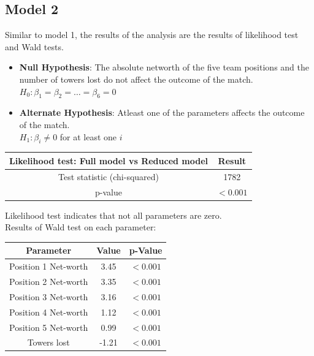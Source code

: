 \documentclass[11pt]{article}
\begin{document}
\subsection{Model 2}
Similar to model 1, the results of the analysis are the results of likelihood test
and Wald tests.
\begin{itemize}
    \item \textbf{Null Hypothesis}: The absolute networth of the five team positions
    and the number of towers lost do not affect the outcome of the match.
    \\ \(H_0: \beta_1 = \beta_2 = \dots = \beta_6 = 0\)
    \item \textbf{Alternate Hypothesis}: Atleast one of the parameters affects the
    outcome of the match.
    \\ \(H_1: \beta_i \neq 0\) for at least one \(i\)
\end{itemize}
\begin{table}[h]
    \centering
    \begin{tabular}{|c|c|}
        \hline
        \textbf{Likelihood test: Full model vs Reduced model} & \textbf{Result} \\
        \hline
        Test statistic (chi-squared) & 1782 \\
        p-value & $< 0.001$ \\
        \hline
    \end{tabular}
\end{table}
Likelihood test indicates that not all parameters are zero.
\\[\baselineskip]
Results of Wald test on each parameter:
\begin{table}[h]
    \centering
    \begin{tabular}{|c|c|c|}
        \hline
        \textbf{Parameter} & \textbf{Value} & \textbf{p-Value} \\
        \hline
        Position 1 Net-worth & 3.45 & $<0.001$\\
        Position 2 Net-worth & 3.35 & $<0.001$\\
        Position 3 Net-worth & 3.16 & $<0.001$\\
        Position 4 Net-worth & 1.12 & $<0.001$\\
        Position 5 Net-worth & 0.99 & $<0.001$\\
        Towers lost & -1.21 & $<0.001$\\
        \hline
    \end{tabular}
\end{table}
\end{document}
